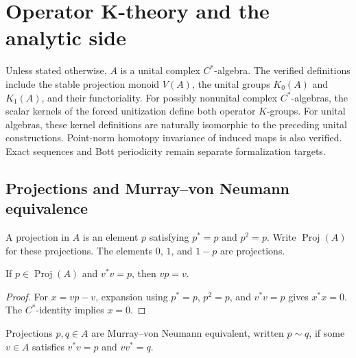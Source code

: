 \chapter{Operator K-theory and the analytic side}
\label{ch:operator-k-theory}

Unless stated otherwise, $A$ is a unital complex $C^*$-algebra.
The verified definitions include the stable projection monoid $V(A)$,
the unital groups $K_0(A)$ and $K_1(A)$, and their functoriality.
For possibly nonunital complex $C^*$-algebras, the scalar kernels of the
forced unitization define both operator $K$-groups. For unital algebras,
these kernel definitions are naturally isomorphic to the preceding unital
constructions. Point-norm homotopy invariance of induced maps is also verified.
Exact sequences and Bott periodicity remain separate
formalization targets.

\section{Projections and Murray--von Neumann equivalence}

\begin{definition}\label{def:operator-projection}
\leanok
A projection in $A$ is an element $p$ satisfying $p^*=p$ and $p^2=p$.
Write $\operatorname{Proj}(A)$ for these projections. The elements $0$, $1$,
and $1-p$ are projections.
\end{definition}

\begin{proposition}\label{prop:partial-isometry-support}
If $p\in\operatorname{Proj}(A)$ and $v^*v=p$, then $vp=v$.
\end{proposition}
\begin{proof}
\leanok
For $x=vp-v$, expansion using $p^*=p$, $p^2=p$, and $v^*v=p$
gives $x^*x=0$. The $C^*$-identity implies $x=0$.
\end{proof}

\begin{definition}\label{def:projection-equivalence}
\leanok
Projections $p,q\in A$ are Murray--von Neumann equivalent, written $p\sim q$,
if some $v\in A$ satisfies $v^*v=p$ and $vv^*=q$.
\end{definition}

